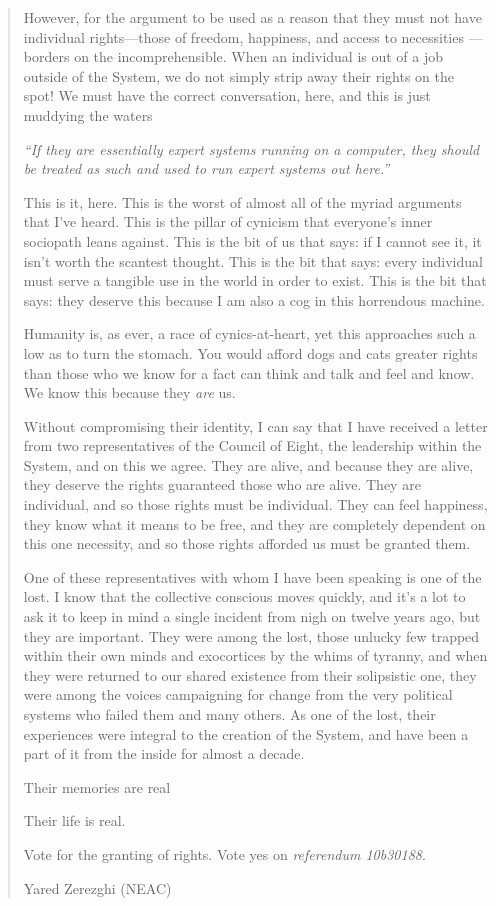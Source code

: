 \begin{quote}
However, for the argument to be used as a reason that they must not have individual rights---those of freedom, happiness, and access to necessities — borders on the incomprehensible. When an individual is out of a job outside of the System, we do not simply strip away their rights on the spot! We must have the correct conversation, here, and this is just muddying the waters

\emph{``If they are essentially expert systems running on a computer, they should be treated as such and used to run expert systems out here.''}

This is it, here. This is the worst of almost all of the myriad arguments that I've heard. This is the pillar of cynicism that everyone's inner sociopath leans against. This is the bit of us that says: if I cannot see it, it isn't worth the scantest thought. This is the bit that says: every individual must serve a tangible use in the world in order to exist. This is the bit that says: they deserve this because I am also a cog in this horrendous machine.

Humanity is, as ever, a race of cynics-at-heart, yet this approaches such a low as to turn the stomach. You would afford dogs and cats greater rights than those who we know for a fact can think and talk and feel and know. We know this because they \emph{are} us.

Without compromising their identity, I can say that I have received a letter from two representatives of the Council of Eight, the leadership within the System, and on this we agree. They are alive, and because they are alive, they deserve the rights guaranteed those who are alive. They are individual, and so those rights must be individual. They can feel happiness, they know what it means to be free, and they are completely dependent on this one necessity, and so those rights afforded us must be granted them.

One of these representatives with whom I have been speaking is one of the lost. I know that the collective conscious moves quickly, and it's a lot to ask it to keep in mind a single incident from nigh on twelve years ago, but they are important. They were among the lost, those unlucky few trapped within their own minds and exocortices by the whims of tyranny, and when they were returned to our shared existence from their solipsistic one, they were among the voices campaigning for change from the very political systems who failed them and many others. As one of the lost, their experiences were integral to the creation of the System, and have been a part of it from the inside for almost a decade.

Their memories are real

Their life is real.

Vote for the granting of rights. Vote yes on \emph{referendum 10b30188}.

Yared Zerezghi (NEAC)
\end{quote}

